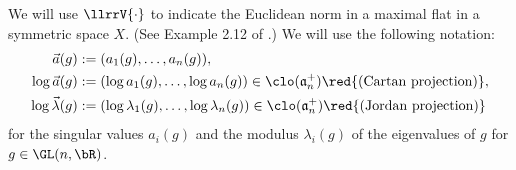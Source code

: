 






%
%


We will use $\llrrV{\cdot}$ to indicate the Euclidean norm in a maximal flat 
in a symmetric space $X$. (See Example 2.12 of \cite{KL18}.)
We will use the following notation: 
\begin{multline*} 
\begin{split} 
\vec{a}(g) & :=(a_1(g), \dots, a_n(g)), \\
\log \vec{a}(g) & := (\log a_1(g), \dots, \log a_n(g)) \in \clo(\mathfrak{a}^+_n)  \red{\hbox{(Cartan projection)}},\\ 
\log \vec{\lambda}(g)  &:= (\log \lambda_1(g), \dots, \log \lambda_n(g)) 
\in \clo(\mathfrak{a}^+_n) \red{\hbox{(Jordan projection)}}
\end{split} 
\end{multline*} 
for the singular values $a_i(g)$ and 
the modulus $\lambda_i(g)$ of the eigenvalues of $g$
for $g \in \GL(n, \bR)$.



